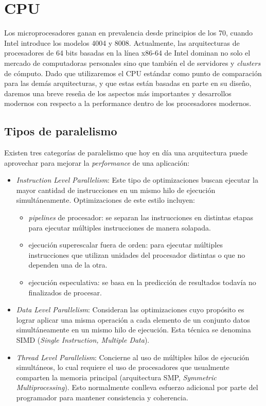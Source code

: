 \section{CPU}

Los microprocesadores ganan en prevalencia desde principios de los 70, cuando Intel introduce los modelos 4004 y 8008.
Actualmente, las arquitecturas de procesadores de 64 bits basadas en la l\'inea x86-64 de Intel dominan no solo el mercado de computadoras personales sino que tambi\'en el de servidores y \textit{clusters} de c\'omputo.
Dado que utilizaremos el CPU est\'andar como punto de comparaci\'on para las dem\'as arquitecturas, y que estas est\'an basadas en parte en su dise\~no, daremos una breve rese\~na de los aspectos m\'as importantes y desarrollos modernos con respecto a la performance dentro de los procesadores modernos.

\subsection{Tipos de paralelismo}

Existen tres categor\'ias de paralelismo que hoy en d\'ia una arquitectura puede aprovechar para mejorar la \textit{performance} de una aplicaci\'on:
\begin{itemize}
    \item \textit{Instruction Level Parallelism}: Este tipo de optimizaciones buscan
    ejecutar la mayor cantidad de instrucciones en un mismo hilo de ejecuci\'on simult\'aneamente.
    Optimizaciones de este estilo incluyen:
    \begin{itemize}
      \item \textit{pipelines} de procesador: se separan las instrucciones en distintas etapas para ejecutar m\'ultiples instrucciones de manera solapada.
      
      \item ejecuci\'on superescalar fuera de orden: para ejecutar m\'ultiples instrucciones que utilizan unidades del procesador distintas o que no dependen una de la otra.
      
      \item ejecuci\'on especulativa: se basa en la predicci\'on de resultados todav\'ia no finalizados de procesar.
    \end{itemize}

    \item \textit{Data Level Parallelism}: Consideran las optimizaciones cuyo prop\'osito es lograr aplicar una misma operaci\'on a cada elemento de un conjunto datos simult\'aneamente
    en un mismo hilo de ejecuci\'on. Esta t\'ecnica se denomina SIMD (\textit{Single Instruction, Multiple Data}).

    \item \textit{Thread Level Parallelism}: Concierne al uso de m\'ultiples hilos de ejecuci\'on simult\'aneos, lo cual requiere el uso de procesadores que usualmente
    comparten la memoria principal (arquitectura SMP, \textit{Symmetric Multiprocessing}).
    Esto normalmente conlleva esfuerzo adicional por parte del programador para mantener consistencia y coherencia.
\end{itemize}

